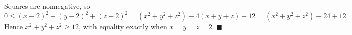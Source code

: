 Squares are nonnegative, so
\[
0\le(x-2)^2+(y-2)^2+(z-2)^2=(x^2+y^2+z^2)-4(x+y+z)+12=(x^2+y^2+z^2)-24+12 .
\]
Hence $x^2+y^2+z^2\ge12$, with equality exactly when $x=y=z=2$. $\blacksquare$

